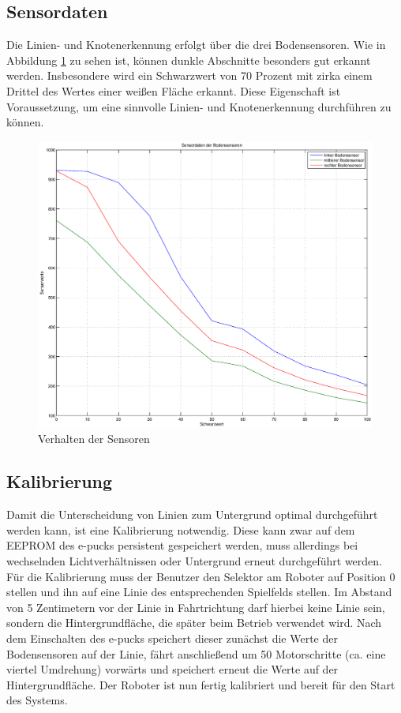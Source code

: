 \documentclass[10pt,a4paper]{article}
\begin{document}
 		\subsection{Sensordaten}
			Die Linien- und Knotenerkennung erfolgt über die drei Bodensensoren. Wie in Abbildung \ref{fig:auswertung} zu sehen ist,
			können dunkle Abschnitte besonders gut erkannt werden. Insbesondere wird ein Schwarzwert von 70 Prozent mit zirka einem
			Drittel des Wertes einer weißen Fläche erkannt. Diese Eigenschaft ist Voraussetzung, um eine sinnvolle Linien- und
			Knotenerkennung durchführen zu können.
			\begin{figure}[h]
				\centering
				\includegraphics[width=15cm]{images/sensorgrafik.eps}
				\caption{Verhalten der Sensoren}		
				\label{fig:auswertung}	
			\end{figure}
		\subsection{Kalibrierung}
			Damit die Unterscheidung von Linien zum Untergrund optimal durchgeführt werden kann, ist eine Kalibrierung notwendig. Diese kann
			zwar auf dem EEPROM des e-pucks persistent gespeichert werden, muss allerdings bei wechselnden Lichtverhältnissen oder Untergrund
			erneut durchgeführt werden. \\
			Für die Kalibrierung muss der Benutzer den Selektor am Roboter auf Position 0 stellen und ihn auf eine Linie des entsprechenden
			Spielfelds stellen. Im Abstand von 5 Zentimetern vor der Linie in Fahrtrichtung darf hierbei keine Linie sein, sondern die
			Hintergrundfläche, die später beim Betrieb verwendet wird. Nach dem Einschalten des e-pucks speichert dieser zunächst die Werte der
			Bodensensoren auf der Linie, fährt anschließend	um 50 Motorschritte (ca. eine viertel Umdrehung) vorwärts und speichert erneut
			die Werte auf der Hintergrundfläche. Der Roboter ist nun fertig kalibriert und bereit für den Start des Systems.
\end{document}
